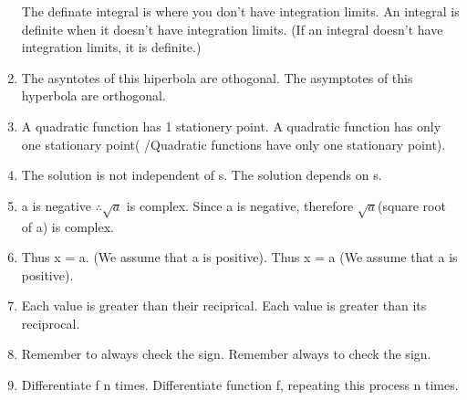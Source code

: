 \documentclass[11pt]{article}
\begin{document}
\begin{enumerate}
The definate integral is where you don't have integration limits. \textrightarrow \hspace*{0.25cm} An integral is definite when it doesn't have integration limits.
(If an integral doesn't have integration limits, it is definite.)
\item
The asyntotes of this hiperbola are othogonal. \textrightarrow \hspace*{0.25cm} The asymptotes of this hyperbola are orthogonal.
\item
A quadratic function has 1 stationery point. \textrightarrow \hspace*{0.25cm} A quadratic function has only one stationary point( /Quadratic functions have only one stationary point).
\item
The solution is not independent of s. \textrightarrow \hspace*{0.25cm} The solution depends on s.
\item
a is negative $\therefore\sqrt{a}$ is complex. \textrightarrow \hspace*{0.25cm} Since a is negative, therefore $\sqrt{a}$(square root of a) is complex.
\item
Thus x = a. (We assume that a is positive). \textrightarrow \hspace*{0.25cm} Thus x = a (We assume that a is positive).
\item
Each value is greater than their reciprical. \textrightarrow \hspace*{0.25cm} Each value is greater than its reciprocal.
\item
Remember to always check the sign. \textrightarrow \hspace*{0.25cm}  Remember always to check the sign.
\item
Differentiate f n times. \textrightarrow \hspace*{0.25cm}  	Differentiate function f, repeating this process n times.

\end{enumerate}
\end{document}
